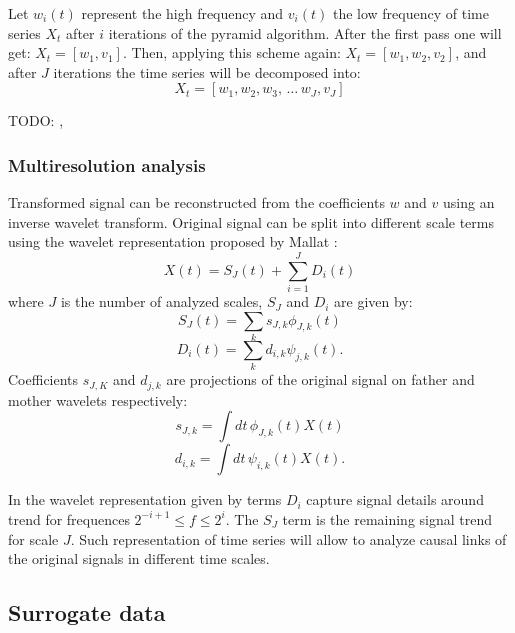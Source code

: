 Let $w_i(t)$ represent the high frequency and $v_i(t)$ the low frequency of time series $X_t$ after $i$ iterations of the pyramid algorithm.
After the first pass one will get: $X_t = [w_1, v_1]$.
Then, applying this scheme again: $X_t = [w_1, w_2, v_2]$, and after $J$ iterations the time series will be decomposed into:
\begin{equation}
	X_t = [w_1, w_2, w_3, \, \dots \, w_J, v_J]
\end{equation}



TODO: \cite{practical-wavelet}, 

\subsubsection{Multiresolution analysis}
Transformed signal can be reconstructed from the coefficients $w$ and $v$ using an inverse wavelet transform.
Original signal can be split into different scale terms using the wavelet representation proposed by Mallat \cite{mallat1989}:
\begin{equation} \label{eq:decomposed}
	X(t) = S_J(t) + \sum_{i=1}^{J} D_i(t)
\end{equation}
where $J$ is the number of analyzed scales, $S_J$ and $D_i$ are given by:
\begin{equation}
	S_J(t) = \sum_k s_{J,k} \phi_{J,k}(t)
\end{equation}
\begin{equation}
	D_i(t) = \sum_k d_{i,k} \psi_{j,k}(t).
\end{equation}
Coefficients $s_{J,K}$ and $d_{j,k}$ are projections of the original signal on father and mother wavelets respectively:
\begin{equation}
	s_{J,k} = \int dt \, \phi_{J,k}(t) X(t)
\end{equation}
\begin{equation}
	d_{i,k} = \int dt \, \psi_{i,k}(t) X(t).
\end{equation}

In the wavelet representation given by  terms $D_i$ capture signal details around trend for frequences $2^{-i+1} \leq f \leq 2^{i}$.
The $S_J$ term is the remaining signal trend for scale $J$.
Such representation of time series will allow to analyze causal links of the original signals in different time scales.

\subsection{Surrogate data}

